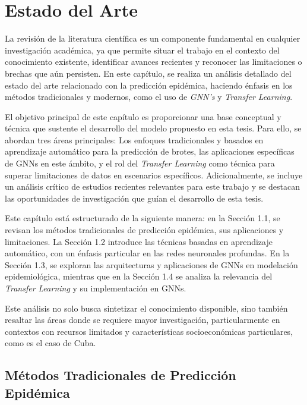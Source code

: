 \chapter{Estado del Arte}\label{chapter:state-of-the-art}

La revisión de la literatura científica es un componente fundamental en cualquier investigación académica, ya que permite situar el trabajo en el contexto del conocimiento existente, identificar avances recientes y reconocer las limitaciones o brechas que aún persisten. En este capítulo, se realiza un análisis detallado del estado del arte relacionado con la predicción epidémica, haciendo énfasis en los métodos tradicionales y modernos, como el uso de \textit{GNN's}  y \textit{Transfer Learning}.

El objetivo principal de este capítulo es proporcionar una base conceptual y técnica que sustente el desarrollo del modelo propuesto en esta tesis. Para ello, se abordan tres áreas principales: Los enfoques tradicionales y basados en aprendizaje automático para la predicción de brotes, las aplicaciones específicas de GNNs en este ámbito, y el rol del \textit{Transfer Learning} como técnica para superar limitaciones de datos en escenarios específicos. Adicionalmente, se incluye un análisis crítico de estudios recientes relevantes para este trabajo y se destacan las oportunidades de investigación que guían el desarrollo de esta tesis.

Este capítulo está estructurado de la siguiente manera: en la Sección 1.1, se revisan los métodos tradicionales de predicción epidémica, sus aplicaciones y limitaciones. La Sección 1.2 introduce las técnicas basadas en aprendizaje automático, con un énfasis particular en las redes neuronales profundas. En la Sección 1.3, se exploran las arquitecturas y aplicaciones de GNNs en modelación epidemiológica, mientras que en la Sección 1.4 se analiza la relevancia del \textit{Transfer Learning} y su implementación en GNNs.

Este análisis no solo busca sintetizar el conocimiento disponible, sino también resaltar las áreas donde se requiere mayor investigación, particularmente en contextos con recursos limitados y características socioeconómicas particulares, como es el caso de Cuba.

\section{Métodos Tradicionales de Predicción Epidémica}\label{section:traditional-methods}

